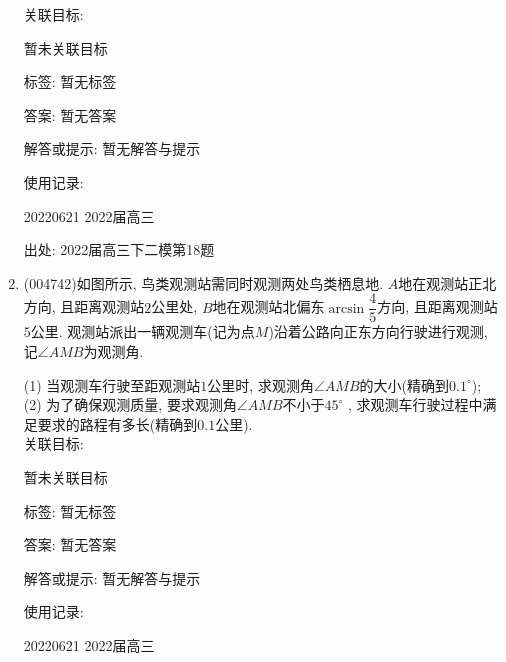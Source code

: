 \documentclass[10pt,a4paper]{article}
\begin{document}
\begin{enumerate}[1.]
关联目标:

暂未关联目标



标签: 暂无标签

答案: 暂无答案

解答或提示: 暂无解答与提示

使用记录:

20220621	2022届高三		


出处: 2022届高三下二模第18题
\item { (004742)}如图所示, 鸟类观测站需同时观测两处鸟类栖息地. $A$地在观测站正北方向, 且距离观测站$2$公里处, $B$地在观测站北偏东$\arcsin\dfrac 45$方向, 且距离观测站$5$公里. 观测站派出一辆观测车(记为点$M$)沿着公路向正东方向行驶进行观测, 记$\angle AMB$为观测角.
\begin{center}
\end{center}
(1) 当观测车行驶至距观测站$1$公里时, 求观测角$\angle AMB$的大小(精确到$0.1^\circ$);\\
(2) 为了确保观测质量, 要求观测角$\angle AMB$不小于$45^\circ$ , 求观测车行驶过程中满足要求的路程有多长(精确到$0.1$公里).\\


关联目标:

暂未关联目标



标签: 暂无标签

答案: 暂无答案

解答或提示: 暂无解答与提示

使用记录:

20220621	2022届高三		



\end{enumerate}
\end{document}
